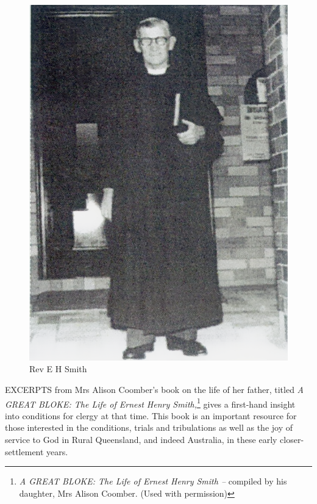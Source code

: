 \begin{figure}
\begin{center}
\includegraphics[width=1.\linewidth,center]{../images/EHSmith.png}
\caption{Rev E H Smith}
\end{center}
\end{figure}




\lettrine[lines=3]{E}{XCERPTS}
 from Mrs Alison Coomber's book on the life of her father, titled \emph{A GREAT BLOKE: The Life of Ernest Henry Smith,}\footnote{\emph{A GREAT BLOKE: The Life of Ernest Henry Smith --} compiled by his daughter, Mrs Alison Coomber. (Used with permission)} gives a first-hand insight into conditions for clergy at that time. This book is an important resource for those interested in the conditions, trials and tribulations as well as the joy of service to God in Rural Queensland, and indeed Australia, in these early closer-settlement years.

